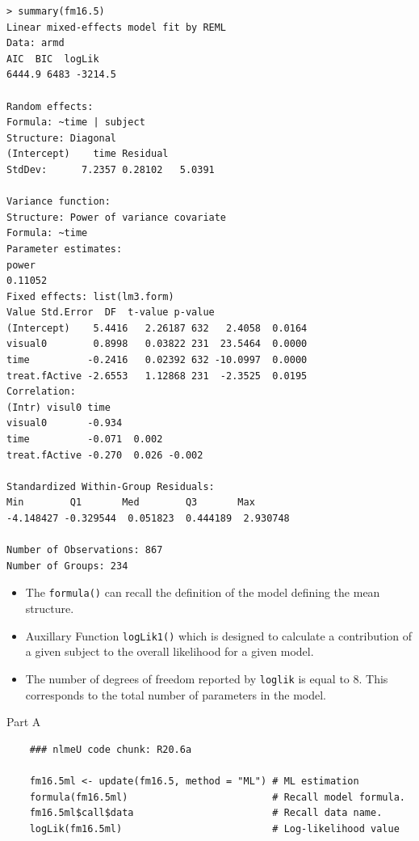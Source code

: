 \documentclass[a4paper,12pt]{article}
\begin{document}
\begin{verbatim}
> summary(fm16.5)
Linear mixed-effects model fit by REML
Data: armd 
AIC  BIC  logLik
6444.9 6483 -3214.5

Random effects:
Formula: ~time | subject
Structure: Diagonal
(Intercept)    time Residual
StdDev:      7.2357 0.28102   5.0391

Variance function:
Structure: Power of variance covariate
Formula: ~time 
Parameter estimates:
power 
0.11052 
Fixed effects: list(lm3.form) 
Value Std.Error  DF  t-value p-value
(Intercept)    5.4416   2.26187 632   2.4058  0.0164
visual0        0.8998   0.03822 231  23.5464  0.0000
time          -0.2416   0.02392 632 -10.0997  0.0000
treat.fActive -2.6553   1.12868 231  -2.3525  0.0195
Correlation: 
(Intr) visul0 time  
visual0       -0.934              
time          -0.071  0.002       
treat.fActive -0.270  0.026 -0.002

Standardized Within-Group Residuals:
Min        Q1       Med        Q3       Max 
-4.148427 -0.329544  0.051823  0.444189  2.930748 

Number of Observations: 867
Number of Groups: 234 
\end{verbatim}
\newpage

\begin{itemize}
\item The \texttt{formula()} can recall the definition of the model defining the mean structure.

\item Auxillary Function \texttt{logLik1()} which is designed to calculate a contribution of a given subject to the overall likelihood for a given model.

\item 
The number of degrees of freedom reported by \texttt{loglik} is equal to 8. This corresponds
to the total number of parameters in the model.
\end{itemize}

Part A
\begin{framed}
\begin{verbatim}
	### nlmeU code chunk: R20.6a

	fm16.5ml <- update(fm16.5, method = "ML") # ML estimation
	formula(fm16.5ml)                         # Recall model formula.
	fm16.5ml$call$data                        # Recall data name.
	logLik(fm16.5ml)                          # Log-likelihood value
\end{verbatim}
\end{framed}
\end{document}
